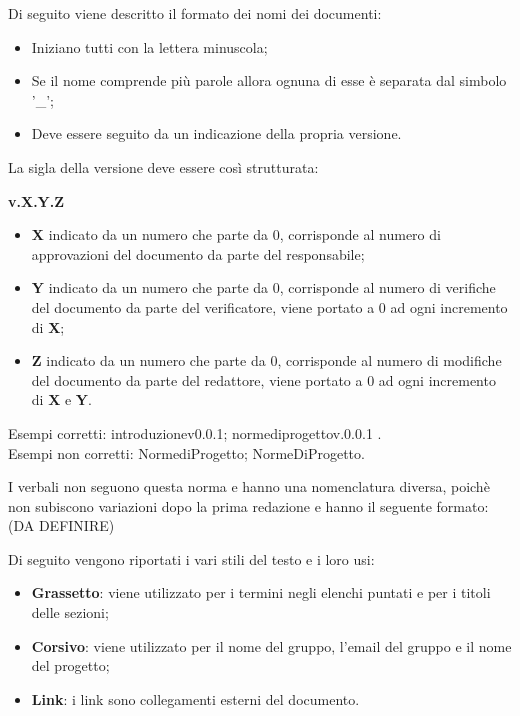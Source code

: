 Di seguito viene descritto il formato dei nomi dei documenti:
\begin{itemize}
\item Iniziano tutti con la lettera minuscola;
\item Se il nome comprende più parole allora ognuna di esse è separata dal simbolo '\_';
\item Deve essere seguito da un indicazione della propria versione.
\end {itemize}
La sigla della versione deve essere così strutturata:
\begin{center}
    \large{\textbf{v.X.Y.Z}}
\end{center}
\begin{itemize}
\item \textbf{X} indicato da un numero che parte da 0, corrisponde al numero di approvazioni del documento da parte del responsabile;
\item \textbf{Y} indicato da un numero che parte da 0, corrisponde al numero di verifiche del documento da parte del verificatore, viene portato a 0 ad ogni incremento di \textbf{X};
\item \textbf{Z} indicato da un numero che parte da 0, corrisponde al numero di modifiche del documento da parte del redattore, viene portato a 0 ad ogni incremento di \textbf{X} e \textbf{Y}.
\end {itemize}
Esempi corretti: introduzione\textunderscore v0.0.1; norme\textunderscore di\textunderscore progetto\textunderscore v.0.0.1 .\\
Esempi non corretti: Norme\textunderscore di\textunderscore Progetto; NormeDiProgetto.

I verbali non seguono questa norma e hanno una nomenclatura diversa, poichè non subiscono variazioni dopo la prima redazione e hanno il seguente formato: (DA DEFINIRE)

Di seguito vengono riportati i vari stili del testo e i loro usi:
\begin {itemize}
\item \textbf{Grassetto}: viene utilizzato per i termini negli elenchi puntati e per i titoli delle sezioni;
\item \textbf{Corsivo}: viene utilizzato per il nome del gruppo, l'email del gruppo e il nome del progetto;
\item \textbf{Link}: i link sono collegamenti esterni del documento.
\end {itemize}

